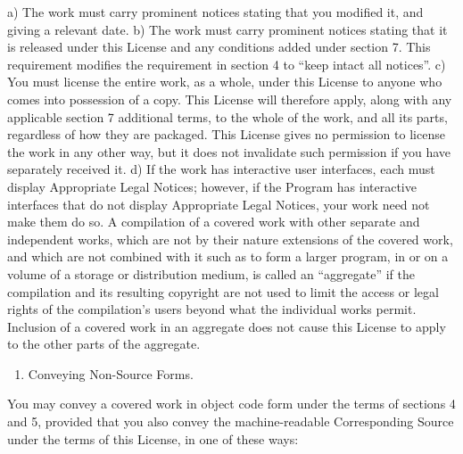 \documentclass[11pt]{article}
\begin{document}
a) The work must carry prominent notices stating that you modified it, and giving a relevant date.
b) The work must carry prominent notices stating that it is released under this License and any conditions added under section 7. This requirement modifies the requirement in section 4 to “keep intact all notices”.
c) You must license the entire work, as a whole, under this License to anyone who comes into possession of a copy. This License will therefore apply, along with any applicable section 7 additional terms, to the whole of the work, and all its parts, regardless of how they are packaged. This License gives no permission to license the work in any other way, but it does not invalidate such permission if you have separately received it.
d) If the work has interactive user interfaces, each must display Appropriate Legal Notices; however, if the Program has interactive interfaces that do not display Appropriate Legal Notices, your work need not make them do so.
A compilation of a covered work with other separate and independent works, which are not by their nature extensions of the covered work, and which are not combined with it such as to form a larger program, in or on a volume of a storage or distribution medium, is called an “aggregate” if the compilation and its resulting copyright are not used to limit the access or legal rights of the compilation's users beyond what the individual works permit. Inclusion of a covered work in an aggregate does not cause this License to apply to the other parts of the aggregate.

\begin{enumerate}
\item Conveying Non-Source Forms.
\end{enumerate}
You may convey a covered work in object code form under the terms of sections 4 and 5, provided that you also convey the machine-readable Corresponding Source under the terms of this License, in one of these ways:
\end{document}
